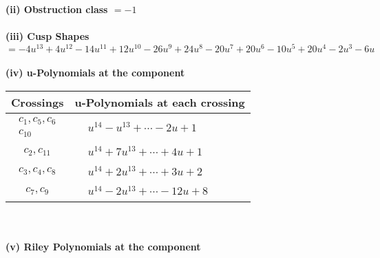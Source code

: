 \documentclass[1p]{elsarticle_modified}
\theoremstyle{definition}
\begin{document}
\flushleft \textbf{(ii) Obstruction class $= -1$}\\~\\
\flushleft \textbf{(iii) Cusp Shapes $= -4 u^{13}+4 u^{12}-14 u^{11}+12 u^{10}-26 u^9+24 u^8-20 u^7+20 u^6-10 u^5+20 u^4-2 u^3-6 u$}\\~\\
\newpage\renewcommand{\arraystretch}{1}
\flushleft \textbf{(iv) u-Polynomials at the component}\newline \\
\begin{tabular}{m{50pt}|m{274pt}}
Crossings & \hspace{64pt}u-Polynomials at each crossing \\
\hline $$\begin{aligned}c_{1},c_{5},c_{6}\\c_{10}\end{aligned}$$&$\begin{aligned}
&u^{14}- u^{13}+\cdots-2 u+1
\end{aligned}$\\
\hline $$\begin{aligned}c_{2},c_{11}\end{aligned}$$&$\begin{aligned}
&u^{14}+7 u^{13}+\cdots+4 u+1
\end{aligned}$\\
\hline $$\begin{aligned}c_{3},c_{4},c_{8}\end{aligned}$$&$\begin{aligned}
&u^{14}+2 u^{13}+\cdots+3 u+2
\end{aligned}$\\
\hline $$\begin{aligned}c_{7},c_{9}\end{aligned}$$&$\begin{aligned}
&u^{14}-2 u^{13}+\cdots-12 u+8
\end{aligned}$\\
\hline
\end{tabular}\\~\\
\newpage\renewcommand{\arraystretch}{1}
\flushleft \textbf{(v) Riley Polynomials at the component}\newline \\
\end{document}
